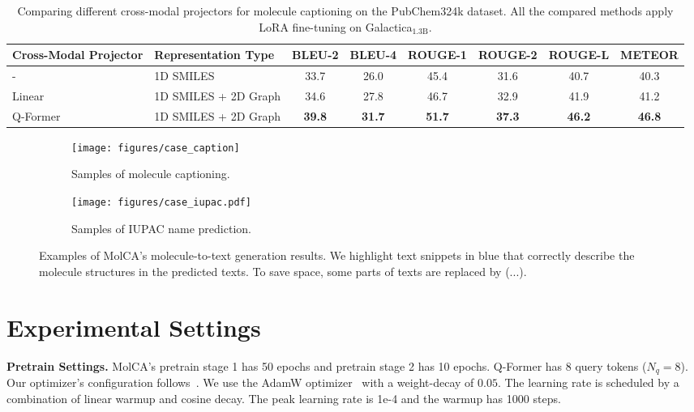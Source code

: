 \documentclass[11pt]{article}
\newcommand{\blue}[1]{\textcolor{bluehightlight}{#1}}
\begin{document}
   \begin{table*}[t]
    \centering
    \small
    \setlength{\tabcolsep}{4pt}
    \begin{tabular}{llcccccc} \toprule
    Cross-Modal Projector & Representation Type  & BLEU-2        & BLEU-4        & ROUGE-1       & ROUGE-2       & ROUGE-L       & METEOR        \\ \midrule
    -                     & 1D SMILES            & 33.7          & 26.0          & 45.4          & 31.6          & 40.7          & 40.3          \\
    Linear                & 1D SMILES + 2D Graph & 34.6          & 27.8          & 46.7          & 32.9          & 41.9          & 41.2          \\
    Q-Former              & 1D SMILES + 2D Graph & \textbf{39.8} & \textbf{31.7} & \textbf{51.7} & \textbf{37.3} & \textbf{46.2} & \textbf{46.8} \\ \bottomrule
    \end{tabular}
    \caption{Comparing different cross-modal projectors for molecule captioning on the PubChem324k dataset. All the compared methods apply LoRA fine-tuning on Galactica$_{\text{1.3B}}$.}
    \label{tab:cross_project}
    \end{table*}


   \begin{figure*}[t!]
    \centering
    \small
    \begin{subfigure}[t]{0.63\textwidth}
    \centering
    \small
    \texttt{[image: figures/case\_caption]}
    \caption{Samples of molecule captioning.}
    \label{fig:case_caption}            
    \end{subfigure}
    \begin{subfigure}[t]{0.32\textwidth}
    \centering
    \small
    \texttt{[image: figures/case\_iupac.pdf]}
    \caption{Samples of IUPAC name prediction.}
    \label{fig:case_iupac}            
    \end{subfigure}
    \caption{Examples of MolCA's molecule-to-text generation results. We highlight text snippets in \blue{blue} that correctly describe the molecule structures in the predicted texts. To save space, some parts of texts are replaced by (...).}
    \label{fig:sample}
\end{figure*}

\section{Experimental Settings}
\label{app:settings}
\textbf{Pretrain Settings.} MolCA's pretrain stage 1 has 50 epochs and pretrain stage 2 has 10 epochs. Q-Former has $8$ query tokens ($N_q=8$). Our optimizer's configuration follows~\cite{BLIP2}. We use the AdamW optimizer~\citep{AdamW} with a weight-decay of $0.05$. The learning rate is scheduled by a combination of linear warmup and cosine decay. The peak learning rate is 1e-4 and the warmup has 1000 steps. 
\end{document}
